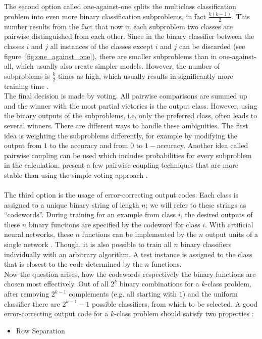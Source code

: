\documentclass[article,type=msc,colorback,accentcolor=tud7b]{tudthesis}
\begin{document}
\begin{itemize}
        The second option called one-against-one splits the multiclass classification problem into even more binary classification subproblems, in fact $\frac{k(k-1)}{2}$. This number results from the fact that now in each subproblem two classes are pairwise distinguished from each other. Since in the binary classifier between the classes $i$ and $j$ all instances of the classes except $i$ and $j$ can be discarded (see figure~\ref{fig:one_against_one}), there are smaller subproblems than in one-against-all, which usually also create simpler models. However, the number of subproblems is $\frac{k}{2}$-times as high, which usually results in significantly more training time \autocite[Subsection~7.1.3]{Bishop2006}. \\
        The final decision is made by voting. All pairwise comparisons are summed up and the winner with the most partial victories is the output class. However, using the binary outputs of the subproblems, i.e. only the preferred class, often leads to several winners. There are different ways to handle these ambiguities. The first idea is weighting the subproblems differently, for example by modifying the output from $1$ to the accuracy and from $0$ to $1-$accuracy. Another idea called pairwise coupling can be used which includes probabilities for every subproblem in the calculation. \citeauthor{Wu2004} present a few pairwise coupling techniques that are more stable than using the simple voting approach \autocite{Wu2004}. \\\\

        The third option is the usage of error-correcting output codes. Each class is assigned to a unique binary string of length $n$; we will refer to these strings as “codewords”. During training for an example from class $i$, the desired outputs of these $n$ binary functions are specified by the codeword for class $i$. With artificial neural networks, these $n$ functions can be implemented by the $n$ output units of a single network \autocite[Section~1]{Dietterich1994}. Though, it is also possible to train all $n$ binary classifiers individually with an arbitrary algorithm. A test instance is assigned to the class that is closest to the code determined by the $n$ functions. \\
        Now the question arises, how the codewords respectively the binary functions are chosen most effectively. Out of all $2^{k}$ binary combinations for a $k$-class problem, after removing $2^{k-1}$ complements (e.g. all starting with $1$) and the uniform classifier there are $2^{k-1}-1$ possible classifiers, from which to be selected. A good error-correcting output code for a $k$-class problem should satisfy two properties \autocite[Subsection~2.3]{Dietterich1994}:
        \begin{itemize}
          \item Row Separation


\end{itemize}
\end{itemize}
\end{document}
